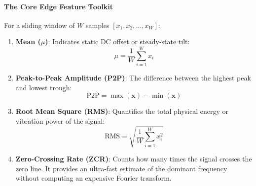 \paragraph{The Core Edge Feature Toolkit}
For a sliding window of $W$ samples $[x_1, x_2, \dots, x_W]$:
\begin{enumerate}
    \item \textbf{Mean ($\mu$)}: Indicates static DC offset or steady-state tilt:
    \begin{equation}
    \mu = \frac{1}{W} \sum_{i=1}^W x_i\label{eq:feat_mean}
    \end{equation}
    \item \textbf{Peak-to-Peak Amplitude (P2P)}: The difference between the highest peak and lowest trough:
    \begin{equation}
    \text{P2P} = \max(\mathbf{x}) - \min(\mathbf{x})\label{eq:feat_p2p}
    \end{equation}
    \item \textbf{Root Mean Square (RMS)}: Quantifies the total physical energy or vibration power of the signal:
    \begin{equation}
    \text{RMS} = \sqrt{\frac{1}{W} \sum_{i=1}^W x_i^2}\label{eq:feat_rms}
    \end{equation}
    \item \textbf{Zero-Crossing Rate (ZCR)}: Counts how many times the signal crosses the zero line. It provides an ultra-fast estimate of the dominant frequency without computing an expensive Fourier transform.
\end{enumerate}

